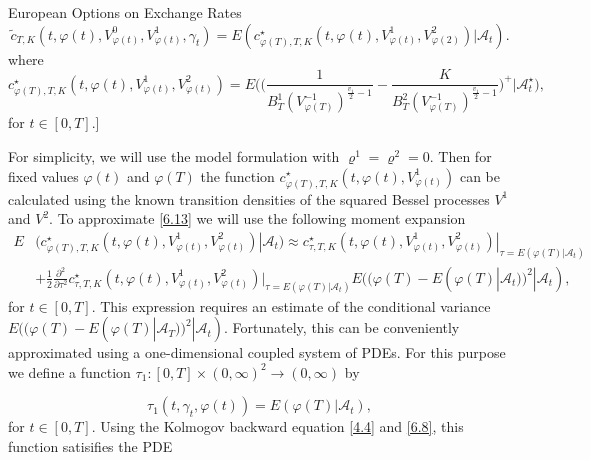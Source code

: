 \documentclass[unknownkeysallowed, compress]{beamer}
\theoremstyle{plain}
\begin{document}
\begin{frame}[allowframebreaks]{European Options on Exchange Rates}
\begin{equation}\label{6.13}
\tilde{c}_{T,K}(t,\varphi(t), V^0_{\varphi(t)}, V^1_{\varphi(t)},\gamma_t) = E(c^\star_{\varphi(T),T,K}(t,\varphi(t),V^1_{\varphi(t)},V^2_{\varphi(2)})|\mathcal{A}_t).   
\end{equation}
where
\begin{equation}\label{6.14}
c^\star_{\varphi(T),T,K}(t,\varphi(t), V^1_{\varphi(t)}, V^2_{\varphi(t)}) = E\bigg(\bigg(\frac{1}{B_T^1(V^{-1}_{\varphi(T)})^{\frac{v_1}{2} - 1}} - \frac{K}{B_T^2(V^{-1}_{\varphi(T)})^{\frac{v_1}{2} - 1}}\bigg)^+\bigg|\mathcal{A}_t^\star\bigg), 
\end{equation}
for $t\in[0,T]$.]\\
\par For simplicity, we will use the model formulation with $\varrho^1 = \varrho^2 = 0$. Then for fixed values $\varphi(t)$ and $\varphi(T)$ the function $c^\star_{\varphi(T),T,K}(t,\varphi(t),V^1_{\varphi(t)})$ can be calculated using the known transition densities of the squared Bessel processes $V^1$ and $V^2$. To approximate \eqref{6.13} we will use the following moment expansion
\begin{equation}\label{6.15}
\begin{split}
E&(c^\star_{\varphi(T),T,K}(t,\varphi(t),V^1_{\varphi(t)},V^2_{\varphi(t)})|\mathcal{A}_t) \approx c^\star_{\tau,T,K}(t,\varphi(t),V^1_{\varphi(t)},V^2_{\varphi(t)})|_{\tau = E(\varphi(T)|\mathcal{A}_t)}\\
&+\frac{1}{2}\frac{\partial^2}{\partial \tau^2}c^\star_{\tau,T,K}(t,\varphi(t), V^1_{\varphi(t)}, V^2_{\varphi(t)})|_{\tau = E(\varphi(T)|\mathcal{A}_t)}E((\varphi(T) - E(\varphi(T)|\mathcal{A}_t))^2|\mathcal{A}_t),
\end{split}
\end{equation}
for $t\in[0,T]$. This expression requires an estimate of the conditional variance $E((\varphi(T) - E(\varphi(T)|\mathcal{A}_T))^2|\mathcal{A}_t)$. Fortunately, this can be conveniently approximated using a one-dimensional coupled system of PDEs. For this purpose we define a function $\tau_1:[0,T]\times (0,\infty)^2\rightarrow (0,\infty)$ by

\begin{equation}\label{6.16}
\tau_1(t,\gamma_t,\varphi(t)) = E(\varphi(T)|\mathcal{A}_t),
\end{equation}
for $t\in[0,T]$. Using the Kolmogov backward equation \eqref{4.4} and \eqref{6.8}, this function satisifies the PDE


\end{frame}
\end{document}
